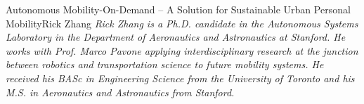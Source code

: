 \documentclass{papertex}
\begin{document}
\begin{news}{2}{Autonomous Mobility-On-Demand -- A Solution for Sustainable Urban Personal Mobility}{Rick Zhang}{}{}
\emph{Rick Zhang is a Ph.D. candidate in the Autonomous Systems Laboratory in the Department of Aeronautics and Astronautics at Stanford. He works with Prof. Marco Pavone applying interdisciplinary research at the junction between robotics and transportation science to future mobility systems. He received his BASc in Engineering Science from the University of Toronto and his M.S. in Aeronautics and Astronautics from Stanford.}

\end{news}
\end{document}
